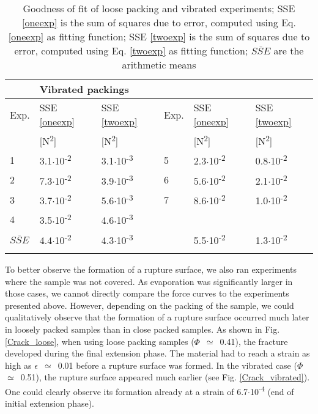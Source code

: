 \begin{table}[h!]
\caption{Goodness of fit of loose packing and vibrated experiments; SSE \eqref{oneexp} is the sum of squares due to error, computed using Eq. \eqref{oneexp} as fitting function; SSE \eqref{twoexp} is the sum of squares due to error, computed using Eq. \eqref{twoexp} as fitting function; $\overline{SSE}$ are the arithmetic means}
\label{Gof}
\begin{tabular}{llllll}
\hline\noalign{\smallskip}
\multicolumn{3}{l}{Loose packings} & \multicolumn{3}{l}{Vibrated packings}\\
\hline\noalign{\smallskip}
Exp. &  SSE \eqref{oneexp} & SSE \eqref{twoexp} & Exp. & SSE \eqref{oneexp} & SSE \eqref{twoexp}\\
& [N\textsuperscript{2}] & [N\textsuperscript{2}] & & [N\textsuperscript{2}] & [N\textsuperscript{2}]\\
\noalign{\smallskip}\hline\noalign{\smallskip}
1 & 3.1$\cdot$10\textsuperscript{-2} & 3.1$\cdot$10\textsuperscript{-3} & 5 & 2.3$\cdot$10\textsuperscript{-2} & 0.8$\cdot$10\textsuperscript{-2}\\
2 & 7.3$\cdot$10\textsuperscript{-2} & 3.9$\cdot$10\textsuperscript{-3} & 6 & 5.6$\cdot$10\textsuperscript{-2} & 2.1$\cdot$10\textsuperscript{-2}\\
3 & 3.7$\cdot$10\textsuperscript{-2} & 5.6$\cdot$10\textsuperscript{-3} & 7 & 8.6$\cdot$10\textsuperscript{-2} & 1.0$\cdot$10\textsuperscript{-2}\\
4 & 3.5$\cdot$10\textsuperscript{-2} & 4.6$\cdot$10\textsuperscript{-3} &  &  & \\
\noalign{\smallskip}\hline\noalign{\smallskip}
$\overline{SSE}$ & 4.4$\cdot$10\textsuperscript{-2} & 4.3$\cdot$10\textsuperscript{-3} &  & 5.5$\cdot$10\textsuperscript{-2} & 1.3$\cdot$10\textsuperscript{-2}\\
\noalign{\smallskip}\hline
\end{tabular} 
\end{table}

To better observe the formation of a rupture surface, we also ran experiments where the sample was not covered. As evaporation was significantly larger in those cases, we cannot directly compare the force curves to the experiments presented above. However, depending on the packing of the sample, we could qualitatively observe that the formation of a rupture surface occurred much later in loosely packed samples than in close packed samples. As shown in Fig. \ref{Crack_loose}, when using loose packing samples ($\Phi$~$\simeq$~0.41), the fracture developed during the final extension phase. The material had to reach a strain as high as $\epsilon$~$\simeq$~0.01 before a rupture surface was formed. In the vibrated case ($\Phi$~$\simeq$~0.51), the rupture surface appeared much earlier (see Fig. \ref{Crack_vibrated}). One could clearly observe its formation already at a strain of 6.7$\cdot$10\textsuperscript{-4} (end of initial extension phase).


